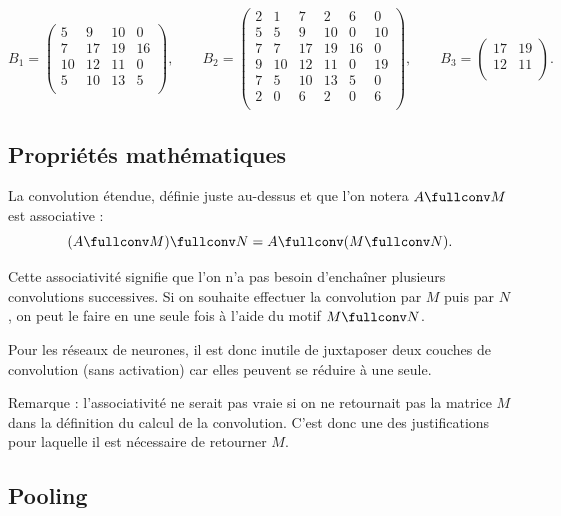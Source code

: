 \documentclass[11pt,class=report,crop=false]{standalone}
\begin{document}
$$B_1 = 
\begin{pmatrix}
 5 & 9  & 10 & 0 \\
 7 & 17 & 19 & 16 \\
10 & 12 & 11 & 0 \\
 5 & 10 & 13 & 5 \\
\end{pmatrix},
\qquad
B_2 = 
\begin{pmatrix}
 2 &  1 &  7 &  2 &  6 &  0 \\
 5 &  5 &  9 & 10 &  0 & 10 \\
 7 &  7 & 17 & 19 & 16 &  0 \\
 9 & 10 & 12 & 11 &  0 & 19 \\
 7 &  5 & 10 & 13 &  5 &  0 \\
 2 &  0 &  6 &  2 &  0 &  6 \\
\end{pmatrix},
\qquad
B_3 = 
 \begin{pmatrix}
17 & 19 \\
12 & 11 \\
\end{pmatrix}.
$$

\subsection{Propriétés mathématiques}

La convolution étendue, définie juste au-dessus et que l'on notera $A \fullconv M$ est associative :
$$(A \fullconv M) \fullconv N = A \fullconv (M \fullconv N).$$

Cette associativité signifie que l'on n'a pas besoin d'enchaîner plusieurs convolutions successives. Si on souhaite effectuer la convolution par $M$ puis par $N$, on peut le faire en une seule fois à l'aide du motif $M \fullconv N$.

Pour les réseaux de neurones, il est donc inutile de juxtaposer deux couches de convolution (sans activation) car elles peuvent se réduire à une seule.

Remarque : l'associativité ne serait pas vraie si on ne retournait pas la matrice $M$ dans la définition du calcul de la convolution. C'est donc une des justifications pour laquelle il est nécessaire de retourner $M$.



\subsection{Pooling}
\end{document}
